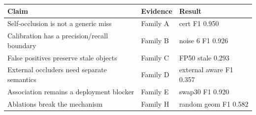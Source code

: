 \begin{tabular}{lll}
\toprule
Claim & Evidence & Result \\
\midrule
Self-occlusion is not a generic miss & Family A & cert F1 0.950 \\
Calibration has a precision/recall boundary & Family B & noise 6 F1 0.926 \\
False positives preserve stale objects & Family C & FP50 stale 0.293 \\
External occluders need separate semantics & Family D & external aware F1 0.357 \\
Association remains a deployment blocker & Family E & swap30 F1 0.920 \\
Ablations break the mechanism & Family H & random geom F1 0.582 \\
\bottomrule
\end{tabular}
